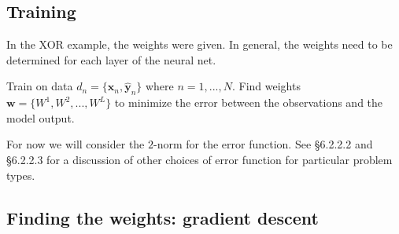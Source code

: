 \documentclass[12pt,letterpaper,noanswers]{exam}
\newcommand{\vc}[1]{\boldsymbol{#1}}
\newcommand{\note}[1]{{#1}} %
\begin{document}
\subsection*{Training}
\note{In the XOR example, the weights were given.  In general, the weights need to be determined for each layer of the neural net.
\begin{tcolorbox}
Train on data $d_n = \{\vc{x}_n,\hat{\vc{y}}_n\}$ where $n=1,...,N$.  Find weights $\vc{w} = \{W^1,W^2,...,W^L\}$ to minimize the error between the observations and the model output.

For now we will consider the $2$-norm for the error function.  See \cite{Goodfellow-et-al-2016} \S 6.2.2.2 and \S 6.2.2.3 for a discussion of other choices of error function for particular problem types.
\end{tcolorbox}
}


\subsection*{Finding the weights: gradient descent}
\end{document}

